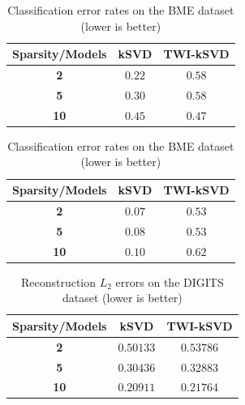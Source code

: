 \documentclass[11pt]{article}
\begin{document}
\begin{table}[!ht]
    \begin{minipage}{.55\linewidth}
      \centering
        \begin{tabular}{ccc}
            \toprule
            \textbf{Sparsity/Models} & \textbf{kSVD} & \textbf{TWI-kSVD} \\
            \midrule
            \textbf{2} & $\bm{0.22}$ & $0.58$ \\
            \textbf{5} & $0.30$ & $0.58$ \\
            \textbf{10} & $0.45$ & $\bm{0.47}$ \\
            \bottomrule
        \end{tabular}
        \caption{Original classification strategy}
    \end{minipage}
    \begin{minipage}{.35\linewidth}
      \centering
        \begin{tabular}{ccc}
            \toprule
            \textbf{Sparsity/Models} & \textbf{kSVD} & \textbf{TWI-kSVD} \\
            \midrule
            \textbf{2} & $\bm{0.07}$ & $\bm{0.53}$ \\
            \textbf{5} & $0.08$ & $\bm{0.53}$ \\
            \textbf{10} & $0.10$ & $0.62$ \\
            \bottomrule
        \end{tabular}
        \caption{Our classification strategy}
    \end{minipage} 
    \caption{Classification error rates on the BME dataset (lower is better)}
    \label{tab:classif_results_BME}
\end{table}

\begin{table}[!ht]
    \centering
        \begin{tabular}{ccc}
            \toprule
            \textbf{Sparsity/Models} & \textbf{kSVD} & \textbf{TWI-kSVD} \\
            \midrule
            \textbf{2} & $0.50133$ & $0.53786$ \\
            \textbf{5} & $0.30436$ & $0.32883$ \\
            \textbf{10} & $\bm{0.20911}$ & $\bm{0.21764}$ \\
            \bottomrule
        \end{tabular}
    \caption{Reconstruction $L_2$ errors on the DIGITS dataset (lower is better)}
    \label{tab:reconstruction_results_DIGITS}
\end{table}
\end{document}
